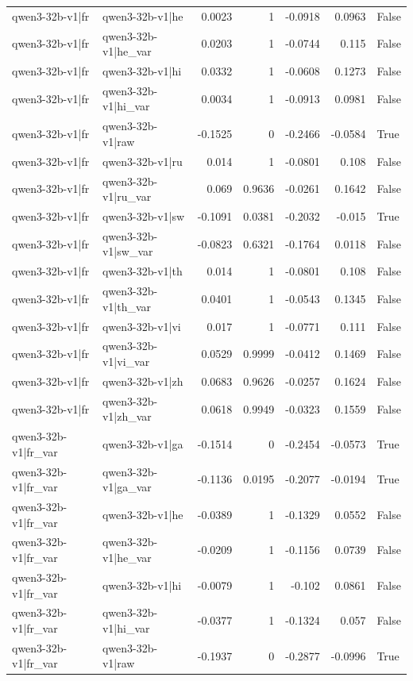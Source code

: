 \begin{table}
\begin{tabular}{l l r r r r l}
qwen3-32b-v1|fr & qwen3-32b-v1|he & 0.0023 & 1 & -0.0918 & 0.0963 & False \\
qwen3-32b-v1|fr & qwen3-32b-v1|he_var & 0.0203 & 1 & -0.0744 & 0.115 & False \\
qwen3-32b-v1|fr & qwen3-32b-v1|hi & 0.0332 & 1 & -0.0608 & 0.1273 & False \\
qwen3-32b-v1|fr & qwen3-32b-v1|hi_var & 0.0034 & 1 & -0.0913 & 0.0981 & False \\
qwen3-32b-v1|fr & qwen3-32b-v1|raw & -0.1525 & 0 & -0.2466 & -0.0584 & True \\
qwen3-32b-v1|fr & qwen3-32b-v1|ru & 0.014 & 1 & -0.0801 & 0.108 & False \\
qwen3-32b-v1|fr & qwen3-32b-v1|ru_var & 0.069 & 0.9636 & -0.0261 & 0.1642 & False \\
qwen3-32b-v1|fr & qwen3-32b-v1|sw & -0.1091 & 0.0381 & -0.2032 & -0.015 & True \\
qwen3-32b-v1|fr & qwen3-32b-v1|sw_var & -0.0823 & 0.6321 & -0.1764 & 0.0118 & False \\
qwen3-32b-v1|fr & qwen3-32b-v1|th & 0.014 & 1 & -0.0801 & 0.108 & False \\
qwen3-32b-v1|fr & qwen3-32b-v1|th_var & 0.0401 & 1 & -0.0543 & 0.1345 & False \\
qwen3-32b-v1|fr & qwen3-32b-v1|vi & 0.017 & 1 & -0.0771 & 0.111 & False \\
qwen3-32b-v1|fr & qwen3-32b-v1|vi_var & 0.0529 & 0.9999 & -0.0412 & 0.1469 & False \\
qwen3-32b-v1|fr & qwen3-32b-v1|zh & 0.0683 & 0.9626 & -0.0257 & 0.1624 & False \\
qwen3-32b-v1|fr & qwen3-32b-v1|zh_var & 0.0618 & 0.9949 & -0.0323 & 0.1559 & False \\
qwen3-32b-v1|fr_var & qwen3-32b-v1|ga & -0.1514 & 0 & -0.2454 & -0.0573 & True \\
qwen3-32b-v1|fr_var & qwen3-32b-v1|ga_var & -0.1136 & 0.0195 & -0.2077 & -0.0194 & True \\
qwen3-32b-v1|fr_var & qwen3-32b-v1|he & -0.0389 & 1 & -0.1329 & 0.0552 & False \\
qwen3-32b-v1|fr_var & qwen3-32b-v1|he_var & -0.0209 & 1 & -0.1156 & 0.0739 & False \\
qwen3-32b-v1|fr_var & qwen3-32b-v1|hi & -0.0079 & 1 & -0.102 & 0.0861 & False \\
qwen3-32b-v1|fr_var & qwen3-32b-v1|hi_var & -0.0377 & 1 & -0.1324 & 0.057 & False \\
qwen3-32b-v1|fr_var & qwen3-32b-v1|raw & -0.1937 & 0 & -0.2877 & -0.0996 & True \\

\end{tabular}
\end{table}
